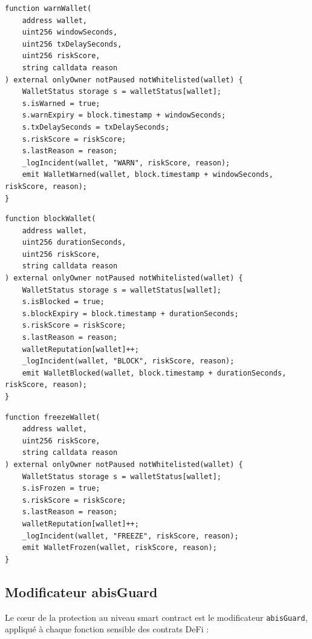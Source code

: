 \documentclass[12pt,a4paper]{report}
\newcommand{\code}[1]{\texttt{#1}}
\begin{document}
\begin{lstlisting}[language=Solidity, caption={Fonction warnWallet}, label={lst:warn_wallet}]
function warnWallet(
    address wallet,
    uint256 windowSeconds,
    uint256 txDelaySeconds,
    uint256 riskScore,
    string calldata reason
) external onlyOwner notPaused notWhitelisted(wallet) {
    WalletStatus storage s = walletStatus[wallet];
    s.isWarned = true;
    s.warnExpiry = block.timestamp + windowSeconds;
    s.txDelaySeconds = txDelaySeconds;
    s.riskScore = riskScore;
    s.lastReason = reason;
    _logIncident(wallet, "WARN", riskScore, reason);
    emit WalletWarned(wallet, block.timestamp + windowSeconds, riskScore, reason);
}
\end{lstlisting}

\begin{lstlisting}[language=Solidity, caption={Fonction blockWallet}, label={lst:block_wallet}]
function blockWallet(
    address wallet,
    uint256 durationSeconds,
    uint256 riskScore,
    string calldata reason
) external onlyOwner notPaused notWhitelisted(wallet) {
    WalletStatus storage s = walletStatus[wallet];
    s.isBlocked = true;
    s.blockExpiry = block.timestamp + durationSeconds;
    s.riskScore = riskScore;
    s.lastReason = reason;
    walletReputation[wallet]++;
    _logIncident(wallet, "BLOCK", riskScore, reason);
    emit WalletBlocked(wallet, block.timestamp + durationSeconds, riskScore, reason);
}
\end{lstlisting}

\begin{lstlisting}[language=Solidity, caption={Fonction freezeWallet}, label={lst:freeze_wallet}]
function freezeWallet(
    address wallet,
    uint256 riskScore,
    string calldata reason
) external onlyOwner notPaused notWhitelisted(wallet) {
    WalletStatus storage s = walletStatus[wallet];
    s.isFrozen = true;
    s.riskScore = riskScore;
    s.lastReason = reason;
    walletReputation[wallet]++;
    _logIncident(wallet, "FREEZE", riskScore, reason);
    emit WalletFrozen(wallet, riskScore, reason);
}
\end{lstlisting}

\subsection{Modificateur abisGuard}

Le cœur de la protection au niveau smart contract est le modificateur \code{abisGuard}, appliqué à chaque fonction sensible des contrats DeFi :
\end{document}
